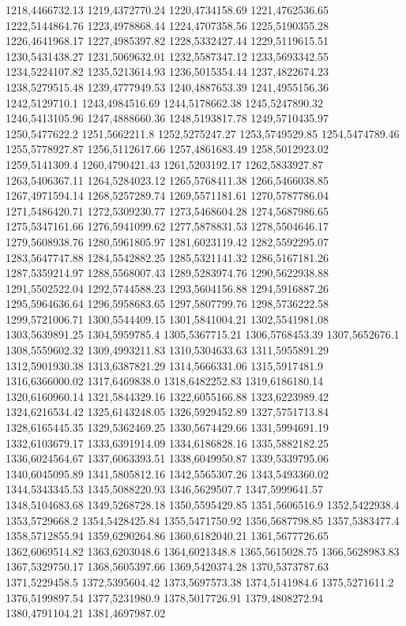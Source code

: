 1218,4466732.13
1219,4372770.24
1220,4734158.69
1221,4762536.65
1222,5144864.76
1223,4978868.44
1224,4707358.56
1225,5190355.28
1226,4641968.17
1227,4985397.82
1228,5332427.44
1229,5119615.51
1230,5431438.27
1231,5069632.01
1232,5587347.12
1233,5693342.55
1234,5224107.82
1235,5213614.93
1236,5015354.44
1237,4822674.23
1238,5279515.48
1239,4777949.53
1240,4887653.39
1241,4955156.36
1242,5129710.1
1243,4984516.69
1244,5178662.38
1245,5247890.32
1246,5413105.96
1247,4888660.36
1248,5193817.78
1249,5710435.97
1250,5477622.2
1251,5662211.8
1252,5275247.27
1253,5749529.85
1254,5474789.46
1255,5778927.87
1256,5112617.66
1257,4861683.49
1258,5012923.02
1259,5141309.4
1260,4790421.43
1261,5203192.17
1262,5833927.87
1263,5406367.11
1264,5284023.12
1265,5768411.38
1266,5466038.85
1267,4971594.14
1268,5257289.74
1269,5571181.61
1270,5787786.04
1271,5486420.71
1272,5309230.77
1273,5468604.28
1274,5687986.65
1275,5347161.66
1276,5941099.62
1277,5878831.53
1278,5504646.17
1279,5608938.76
1280,5961805.97
1281,6023119.42
1282,5592295.07
1283,5647747.88
1284,5542882.25
1285,5321141.32
1286,5167181.26
1287,5359214.97
1288,5568007.43
1289,5283974.76
1290,5622938.88
1291,5502522.04
1292,5744588.23
1293,5604156.88
1294,5916887.26
1295,5964636.64
1296,5958683.65
1297,5807799.76
1298,5736222.58
1299,5721006.71
1300,5544409.15
1301,5841004.21
1302,5541981.08
1303,5639891.25
1304,5959785.4
1305,5367715.21
1306,5768453.39
1307,5652676.1
1308,5559602.32
1309,4993211.83
1310,5304633.63
1311,5955891.29
1312,5901930.38
1313,6387821.29
1314,5666331.06
1315,5917481.9
1316,6366000.02
1317,6469838.0
1318,6482252.83
1319,6186180.14
1320,6160960.14
1321,5844329.16
1322,6055166.88
1323,6223989.42
1324,6216534.42
1325,6143248.05
1326,5929452.89
1327,5751713.84
1328,6165445.35
1329,5362469.25
1330,5674429.66
1331,5994691.19
1332,6103679.17
1333,6391914.09
1334,6186828.16
1335,5882182.25
1336,6024564.67
1337,6063393.51
1338,6049950.87
1339,5339795.06
1340,6045095.89
1341,5805812.16
1342,5565307.26
1343,5493360.02
1344,5343345.53
1345,5088220.93
1346,5629507.7
1347,5999641.57
1348,5104683.68
1349,5268728.18
1350,5595429.85
1351,5606516.9
1352,5422938.4
1353,5729668.2
1354,5428425.84
1355,5471750.92
1356,5687798.85
1357,5383477.4
1358,5712855.94
1359,6290264.86
1360,6182040.21
1361,5677726.65
1362,6069514.82
1363,6203048.6
1364,6021348.8
1365,5615028.75
1366,5628983.83
1367,5329750.17
1368,5605397.66
1369,5420374.28
1370,5373787.63
1371,5229458.5
1372,5395604.42
1373,5697573.38
1374,5141984.6
1375,5271611.2
1376,5199897.54
1377,5231980.9
1378,5017726.91
1379,4808272.94
1380,4791104.21
1381,4697987.02
